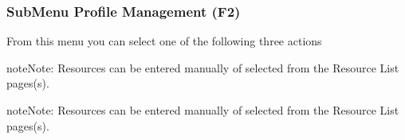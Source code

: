 \documentclass[letterpaper,10pt,english]{sphinxmanual}
\begin{document}
\sphinxAtStartPar
{}

\sphinxAtStartPar
{}

\sphinxAtStartPar
{}


\subsubsection{Sub\sphinxhyphen{}Menu Profile Management (F2)}
\label{\detokenize{connectivity_guide:sub-menu-profile-management-f2}}
\sphinxAtStartPar
From this menu you can select one of the following three actions

\sphinxAtStartPar
{}

\sphinxAtStartPar
{}

\begin{sphinxadmonition}{note}{Note:}
\sphinxAtStartPar
Resources can be entered manually of selected from the Resource List pages(s).
\end{sphinxadmonition}

\sphinxAtStartPar
{}

\sphinxAtStartPar
{}

\begin{sphinxadmonition}{note}{Note:}
\sphinxAtStartPar
Resources can be entered manually of selected from the Resource List pages(s).
\end{sphinxadmonition}

\sphinxAtStartPar
{}

\sphinxAtStartPar
{}

\sphinxAtStartPar
{}

\sphinxAtStartPar
{}

\sphinxAtStartPar
{}

\sphinxAtStartPar
{}

\sphinxAtStartPar
{}
\end{document}

